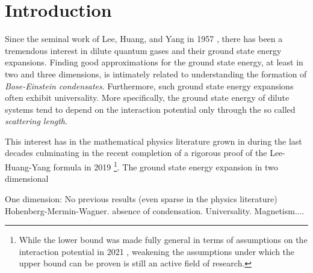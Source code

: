  \chapter{Introduction}
Since the seminal work of Lee, Huang, and Yang in 1957 \cite{lee1957eigenvalues}, there has been a tremendous interest in dilute quantum gases and their ground state energy expansions. Finding good approximations for the ground state energy, at least in two and three dimensions, is intimately related to understanding the formation of \emph{Bose-Einstein condensates}. Furthermore, such ground state energy expansions often exhibit universality. More specifically, the ground state energy of dilute systems tend to depend on the interaction potential only through the so called \emph{scattering length}.

This interest has in the mathematical physics literature grown in during the last decades culminating in the recent completion of a rigorous proof of the Lee-Huang-Yang formula in 2019 \cite{yau2009second,fournais2020energy}\footnote{While the lower bound was made fully general in terms of assumptions on the interaction potential in 2021 \cite{fournais2021energy}, weakening the assumptions under which the upper bound can be proven is still an active field of research. }. The ground state energy expansion in two dimensional

One dimension: No previous results (even sparse in the physics literature) Hohenberg-Mermin-Wagner. absence of condensation. Universality. Magnetism....

